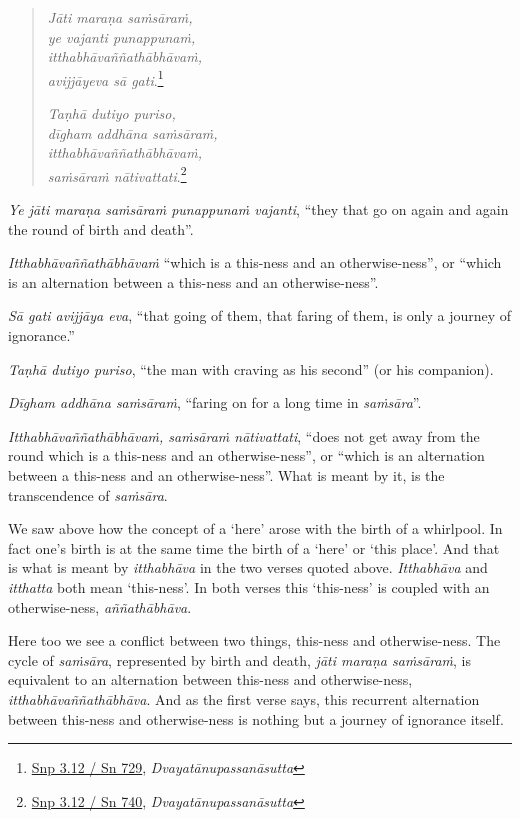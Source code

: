 \begin{quote}
\emph{Jāti maraṇa saṁsāraṁ,}\\
\emph{ye vajanti punappunaṁ,}\\
\emph{itthabhāvaññathābhāvaṁ,}\\
\emph{avijjāyeva sā gati}.\footnote{\href{https://suttacentral.net/snp3.12/pli/ms}{Snp 3.12 / Sn 729}, \emph{Dvayatānupassanāsutta}}

\emph{Taṇhā dutiyo puriso,}\\
\emph{dīgham addhāna saṁsāraṁ,}\\
\emph{itthabhāvaññathābhāvaṁ,}\\
\emph{saṁsāraṁ nātivattati}.\footnote{\href{https://suttacentral.net/snp3.12/pli/ms}{Snp 3.12 / Sn 740}, \emph{Dvayatānupassanāsutta}}
\end{quote}

\emph{Ye jāti maraṇa saṁsāraṁ punappunaṁ vajanti}, ``they that go on again and again the round of birth and death''.

\enlargethispage{\baselineskip}

\emph{Itthabhāvaññathābhāvaṁ} ``which is a this-ness and an otherwise-ness'', or ``which is an alternation between a this-ness and an otherwise-ness''.

\emph{Sā gati avijjāya eva}, ``that going of them, that faring of them, is only a journey of ignorance.''

\emph{Taṇhā dutiyo puriso}, ``the man with craving as his second'' (or his companion).

\emph{Dīgham addhāna saṁsāraṁ}, ``faring on for a long time in \emph{saṁsāra}''.

\emph{Itthabhāvaññathābhāvaṁ, saṁsāraṁ nātivattati}, ``does not get away from the round which is a this-ness and an otherwise-ness'', or ``which is an alternation between a this-ness and an otherwise-ness''. What is meant by it, is the transcendence of \emph{saṁsāra}.

We saw above how the concept of a `here' arose with the birth of a whirlpool. In fact one's birth is at the same time the birth of a `here' or `this place'. And that is what is meant by \emph{itthabhāva} in the two verses quoted above. \emph{Itthabhāva} and \emph{itthatta} both mean `this-ness'. In both verses this `this-ness' is coupled with an otherwise-ness, \emph{aññathābhāva}.

Here too we see a conflict between two things, this-ness and otherwise-ness. The cycle of \emph{saṁsāra}, represented by birth and death, \emph{jāti maraṇa saṁsāraṁ}, is equivalent to an alternation between this-ness and otherwise-ness, \emph{itthabhāvaññathābhāva}. And as the first verse says, this recurrent alternation between this-ness and otherwise-ness is nothing but a journey of ignorance itself.

